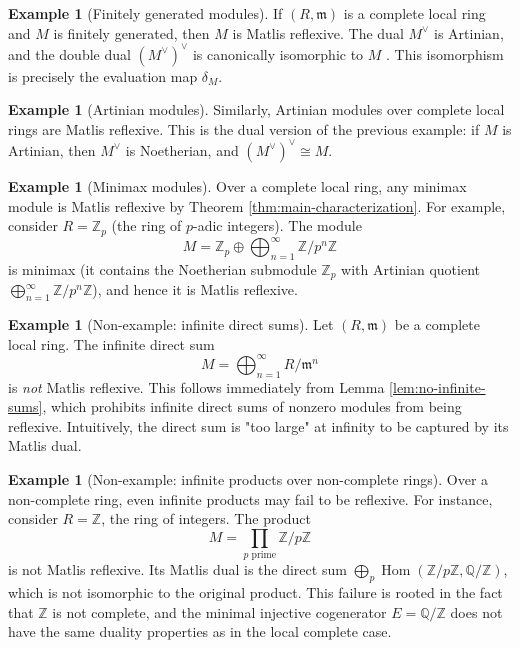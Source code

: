\documentclass{kms-c}
\theoremstyle{plain}
\theoremstyle{definition}
\newtheorem{example}[theorem]{Example}
\theoremstyle{remark}
\begin{document}
\begin{example}[Finitely generated modules]
If \( (R, \mathfrak{m}) \) is a complete local ring and \( M \) is finitely generated, then \( M \) is Matlis reflexive. The dual \( M^\vee \) is Artinian, and the double dual \( (M^\vee)^\vee \) is canonically isomorphic to \( M \) \cite{Matlis1958}. This isomorphism is precisely the evaluation map \( \delta_M \).
\end{example}

\begin{example}[Artinian modules]
Similarly, Artinian modules over complete local rings are Matlis reflexive. This is the dual version of the previous example: if \( M \) is Artinian, then \( M^\vee \) is Noetherian, and \( (M^\vee)^\vee \cong M \).
\end{example}

\begin{example}[Minimax modules]
Over a complete local ring, any minimax module is Matlis reflexive by Theorem \ref{thm:main-characterization}. For example, consider \( R = \mathbb{Z}_p \) (the ring of \( p \)-adic integers). The module
\[
M = \mathbb{Z}_p \oplus \bigoplus_{n=1}^\infty \mathbb{Z}/p^n\mathbb{Z}
\]
is minimax (it contains the Noetherian submodule \( \mathbb{Z}_p \) with Artinian quotient \( \bigoplus_{n=1}^\infty \mathbb{Z}/p^n\mathbb{Z} \)), and hence it is Matlis reflexive.
\end{example}

\begin{example}[Non-example: infinite direct sums]
Let \( (R, \mathfrak{m}) \) be a complete local ring. The infinite direct sum
\[
M = \bigoplus_{n=1}^\infty R/\mathfrak{m}^n
\]
is \emph{not} Matlis reflexive. This follows immediately from Lemma \ref{lem:no-infinite-sums}, which prohibits infinite direct sums of nonzero modules from being reflexive. Intuitively, the direct sum is "too large" at infinity to be captured by its Matlis dual.
\end{example}

\begin{example}[Non-example: infinite products over non-complete rings]
Over a non-complete ring, even infinite products may fail to be reflexive. For instance, consider \( R = \mathbb{Z} \), the ring of integers. The product
\[
M = \prod_{p \text{ prime}} \mathbb{Z}/p\mathbb{Z}
\]
is not Matlis reflexive. Its Matlis dual is the direct sum \( \bigoplus_{p} \operatorname{Hom}(\mathbb{Z}/p\mathbb{Z}, \mathbb{Q}/\mathbb{Z}) \), which is not isomorphic to the original product. This failure is rooted in the fact that \( \mathbb{Z} \) is not complete, and the minimal injective cogenerator \( E = \mathbb{Q}/\mathbb{Z} \) does not have the same duality properties as in the local complete case.
\end{example}
\end{document}
